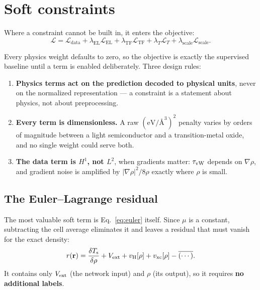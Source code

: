 \section{Soft constraints}

Where a constraint cannot be built in, it enters the objective:
\begin{equation}
  \mathcal{L} = \mathcal{L}_{\mathrm{data}}
    + \lambda_{\mathrm{EL}}\mathcal{L}_{\mathrm{EL}}
    + \lambda_{\mathrm{TF}}\mathcal{L}_{\mathrm{TF}}
    + \lambda_{T}\mathcal{L}_{T}
    + \lambda_{\mathrm{scale}}\mathcal{L}_{\mathrm{scale}} .
\end{equation}

Every physics weight defaults to zero, so the objective is exactly the
supervised baseline until a term is enabled deliberately. Three design rules:

\begin{enumerate}
  \item \textbf{Physics terms act on the prediction decoded to physical units},
    never on the normalized representation --- a constraint is a statement about
    physics, not about preprocessing.
  \item \textbf{Every term is dimensionless.} A raw
    $(\mathrm{eV}/\text{\AA}^3)^2$ penalty varies by orders of magnitude between
    a light semiconductor and a transition-metal oxide, and no single weight
    could serve both.
  \item \textbf{The data term is $H^1$, not $L^2$}, when gradients matter:
    $\tau_{\mathrm{vW}}$ depends on $\nabla\rho$, and gradient noise is amplified by
    $|\nabla\rho|^2/8\rho$ exactly where $\rho$ is small.
\end{enumerate}

\subsection{The Euler--Lagrange residual}

The most valuable soft term is Eq.~\eqref{eq:euler} itself. Since $\mu$ is a
constant, subtracting the cell average eliminates it and leaves a residual that
must vanish for the exact density:
\begin{equation}
  r(\mathbf{r}) = \frac{\delta T_{\mathrm{s}}}{\delta\rho} + V_{\mathrm{ext}} + v_{\mathrm{H}}[\rho] + v_{\mathrm{xc}}[\rho]
           - \overline{(\cdots)} .
  \label{eq:elresidual}
\end{equation}
It contains only $V_{\mathrm{ext}}$ (the network input) and $\rho$ (its output), so it
requires \textbf{no additional labels}.

